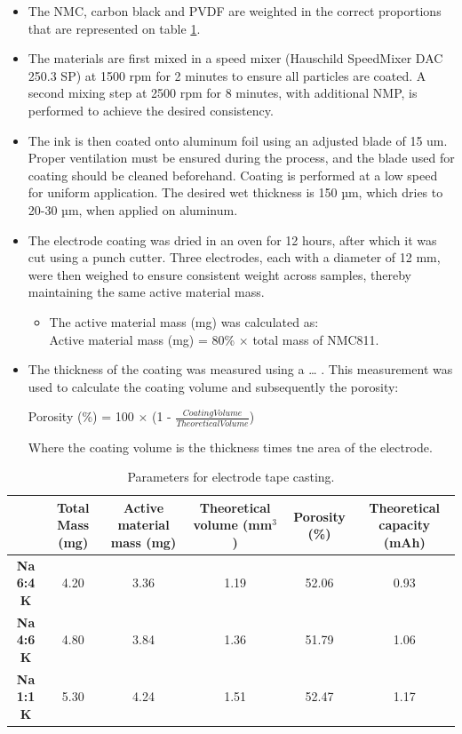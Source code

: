 \documentclass{article}
\begin{document}
  \begin{itemize}
    \item The NMC, carbon black and PVDF are weighted in the correct proportions that are represented on 
    table \ref{t3}.
    \item The materials are first mixed in a speed mixer (Hauschild SpeedMixer DAC 250.3 SP)  at 1500 rpm for 2 minutes to ensure all particles are coated. A second mixing step at 2500 rpm for 8 minutes, with additional NMP, is performed to achieve the desired consistency.
    \item The ink is then coated onto aluminum foil using an adjusted blade of 15 um. Proper ventilation must be ensured during the process, and the blade used for coating should be cleaned beforehand. Coating is performed at a low speed for uniform application. The desired wet thickness is 150 µm, which dries to 20-30 µm, when applied on aluminum.
    \item The electrode coating was dried in an oven for 12 hours, after which it was cut using a punch cutter. Three electrodes, each with a diameter of 12 mm, were then weighed to ensure consistent weight across samples, thereby maintaining the same active material mass.
    \begin{itemize}
      \item The active material mass (mg) was calculated as:\\
       Active material mass (mg) =  80\% \(\times\) total mass of NMC811.
    \end{itemize}
    \item The thickness of the coating was measured using a … . This measurement was used to calculate the coating volume and subsequently the porosity:\\
    \begin{center}
    Porosity (\%) = 100 \(\times\) (1 - \(\frac{Coating Volume }{Theoretical Volume }\))\\
  \end{center}
    Where the  coating volume is the thickness times tne area of the electrode. 
  \end{itemize}
  

\begin{table}[h!]
  \centering
  \begin{adjustbox}{width=1\textwidth}
  \small
  \begin{tabular}{|c|c|c|c|c|c|}
    \hline
	& \textbf{Total Mass (mg)} & \textbf{Active material mass (mg)} & \textbf{Theoretical volume (mm$^3$)} & \textbf{Porosity (\%)} & \textbf{Theoretical capacity (mAh)} \\
	\hline
	\textbf{Na 6:4 K} & 4.20 & 3.36 & 1.19 & 52.06 & 0.93\\
	\hline
	\textbf{Na 4:6 K} & 4.80 & 3.84 & 1.36 & 51.79 & 1.06 \\
	\hline
	\textbf{Na 1:1 K} & 5.30 & 4.24 & 1.51 & 52.47 & 1.17 \\
	\hline
  \end{tabular}
  \end{adjustbox}
  \caption{Parameters for electrode tape casting.}
  \label{t3}
\end{table}
\end{document}
